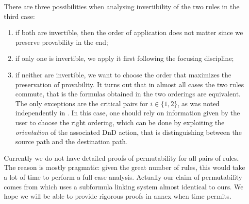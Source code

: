 There are three possibilities when analysing invertibility of the two rules in
the third case:
\begin{enumerate}
  \item if both are invertible, then the order of application does not matter
  since we preserve provability in the end;
  \item if only one is invertible, we apply it first following the focusing
  discipline;
  \item if neither are invertible, we want to choose the order that maximizes
  the preservation of provability. It turns out that in almost all cases the two
  rules commute, that is the formulas obtained in the two orderings are
  equivalent. The only exceptions are the critical pairs  for $i \in \{1,2\}$, as was noted independently in
  . In this case, one should rely on
  information given by the user to choose the right ordering, which can be done
  by exploiting the \emph{orientation} of the associated DnD action, that is
  distinguishing between the source path and the destination path.
\end{enumerate}
Currently we do not have detailed proofs of permutability for all pairs of
rules. The reason is mostly pragmatic: given the great number of rules, this
would take a lot of time to perform a full case analysis. Actually our claim of
permutability comes from \cite{DBLP:conf/cade/Chaudhuri21} which uses a
subformula linking system almost identical to ours. We hope we will be able to
provide rigorous proofs in annex when time permits.


